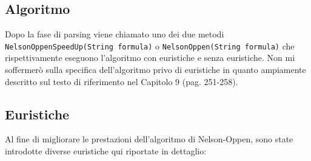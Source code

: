 \documentclass[a4paper,11pt]{article}
\begin{document}
\subsection{Algoritmo}
Dopo la fase di parsing viene chiamato uno dei due metodi {\tt NelsonOppenSpeedUp(String formula)} o {\tt NelsonOppen(String formula)} che rispettivamente eseguono l'algoritmo con euristiche e senza euristiche.
Non mi soffermerò sulla specifica dell'algoritmo privo di euristiche in quanto ampiamente descritto sul testo di riferimento nel Capitolo 9 (pag. 251-258).

\subsection{Euristiche}
Al fine di migliorare le prestazioni dell'algoritmo di Nelson-Oppen, sono state introdotte diverse euristiche qui riportate in dettaglio:
\end{document}
